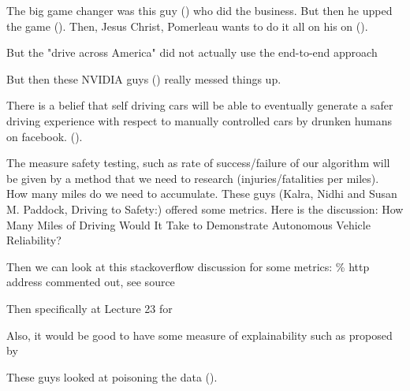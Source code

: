 The big game changer was this guy (\cite{Pomerleau93knowledge-basedtraining}) who did the business. But then he upped the game (\cite{6796843}). Then, Jesus Christ, Pomerleau wants to do it all on his on (\cite{Jochem-1996-16257}).

But the "drive across America" did not actually use the end-to-end approach 

But then these NVIDIA guys (\cite{journals/corr/BojarskiTDFFGJM16}) really messed things up.

There is a belief that self driving cars will be able to eventually generate a safer driving experience with respect to manually controlled cars by drunken humans on facebook. (\cite{Dingus201513271}).  

The measure safety testing, such as rate of success/failure of our algorithm will be given by a method that we need to research (injuries/fatalities per miles). How many miles do we need to accumulate. These guys (Kalra, Nidhi and Susan M. Paddock, Driving to Safety:) offered some metrics.
Here is the discussion:   
How Many Miles of Driving Would It Take to Demonstrate Autonomous Vehicle Reliability?

Then we can look at this stackoverflow discussion for some metrics:
\% http address commented out, see source

Then specifically at Lecture 23 for 


Also, it would be good to have some measure of explainability such as proposed by 
\cite{Zeiler:2014}

These guys looked at poisoning the data (\cite{bansal2018chauffeurnet}).


